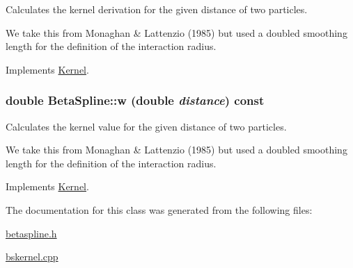 Calculates the kernel derivation for the given distance of two particles. 

We take this from Monaghan \& Lattenzio (1985) but used a doubled smoothing length for the definition of the interaction radius. 

Implements \hyperlink{classKernel_545e61b98db05db6dd02b88e2ad3da23}{Kernel}.\hypertarget{classBetaSpline_797016b36239b0be98c3aa0715bb045a}{
\subsubsection[{w}]{\setlength{\rightskip}{0pt plus 5cm}double BetaSpline::w (double {\em distance}) const}}
\label{classBetaSpline_797016b36239b0be98c3aa0715bb045a}


Calculates the kernel value for the given distance of two particles. 

We take this from Monaghan \& Lattenzio (1985) but used a doubled smoothing length for the definition of the interaction radius. 

Implements \hyperlink{classKernel_6b4d26ba99457a4acbbbca1454dbdc8a}{Kernel}.

The documentation for this class was generated from the following files:\begin{CompactItemize}
\item 
\hyperlink{betaspline_8h}{betaspline.h}\item 
\hyperlink{bskernel_8cpp}{bskernel.cpp}\end{CompactItemize}
